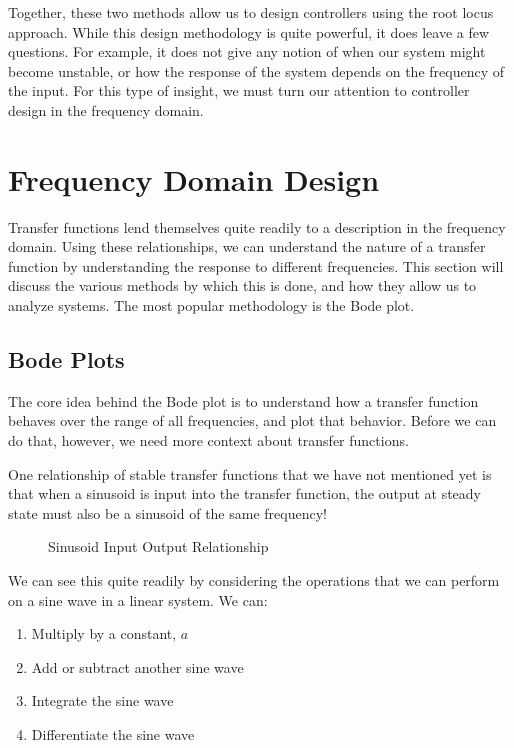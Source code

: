 Together, these two methods allow us to design controllers using the root locus approach. While this design methodology is quite powerful, it does leave a few questions. For example, it does not give any notion of when our system might become unstable, or how the response of the system depends on the frequency of the input. For this type of insight, we must turn our attention to controller design in the frequency domain.


\newpage
\printendnotes
\chapter{Frequency Domain Design}\label{chap:frequency}
Transfer functions lend themselves quite readily to a description in the frequency domain. Using these relationships, we can understand the nature of a transfer function by understanding the response to different frequencies. This section will discuss the various methods by which this is done, and how they allow us to analyze systems. The most popular methodology is the Bode plot.

\section{Bode Plots}
The core idea behind the Bode plot is to understand how a transfer function behaves over the range of all frequencies, and plot that behavior. Before we can do that, however, we need more context about transfer functions.

One relationship of stable transfer functions that we have not mentioned yet is that when a sinusoid is input into the transfer function, the output at steady state must also be a sinusoid of the same frequency!
\begin{figure}[H]
    \centering
    
    \caption{Sinusoid Input Output Relationship}
    \label{fig:sinInOut}
\end{figure}
We can see this quite readily by considering the operations that we can perform on a sine wave in a linear system. We can:
\begin{enumerate}
    \item Multiply by a constant, $a$
    \item Add or subtract another sine wave
    \item Integrate the sine wave
    \item Differentiate the sine wave
\end{enumerate}

